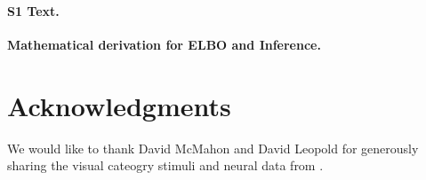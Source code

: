 \documentclass[10pt,letterpaper]{article}
\begin{document}
\paragraph*{S1 Text.}
\label{S1_Text}
{\bf Mathematical derivation for ELBO and Inference.}


\section*{Acknowledgments}
We would like to thank David McMahon and David Leopold for generously sharing the visual cateogry stimuli and neural data from \cite{McMahon2014-qq}.

\nolinenumbers

%
%
%

{}
\end{document}
